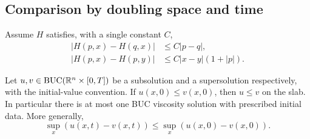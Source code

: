 \subsection{Comparison by doubling space and time}
Assume $H$ satisfies, with a single constant $C$,
\begin{equation}\label{eq:10-H-lip}
 \begin{split}
 |H(p,x)-H(q,x)|&\leq C|p-q|,\\
 |H(p,x)-H(p,y)|&\leq C|x-y|(1+|p|).
 \end{split}
\end{equation}
\Needspace{55mm}
\begin{theorem}
Let $u,v\in\mathrm{BUC}(\mathbb{R}^n\times[0,T])$ be a subsolution and a
supersolution respectively, with the initial-value convention.
If $u(x,0)\leq v(x,0)$, then $u\leq v$ on the slab. In particular
there is at most one BUC viscosity solution with prescribed initial data.
More generally,
\[
 \sup_x(u(x,t)-v(x,t))\leq\sup_x(u(x,0)-v(x,0)).
\]
\end{theorem}
